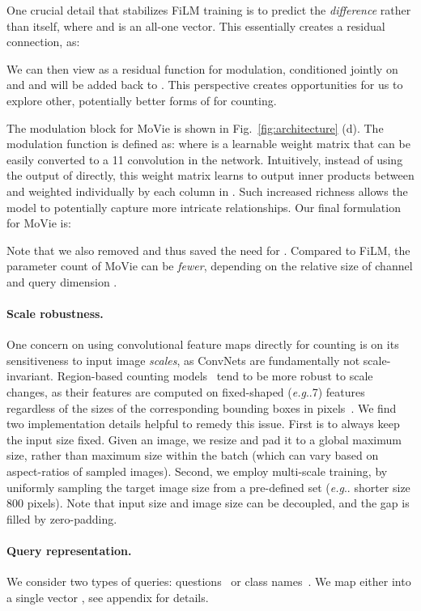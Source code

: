 \documentclass{article} \usepackage[dvipsnames,table]{xcolor}
\makeatletter
\newcommand{\ours}[0]{MoVie\xspace}
\def\x{\xspace}
\DeclareRobustCommand\onedot{\futurelet\@let@token\@onedot}
\def\@onedot{\ifx\@let@token.\else.\null\fi\xspace}
\def\eg{\emph{e.g}\onedot} \def\Eg{\emph{E.g}\onedot}
\makeatother
\begin{document}
One crucial detail that stabilizes FiLM training is to predict the \emph{difference}  rather than  itself, where  and  is an all-one vector. This essentially creates a residual connection, as:

We can then view  as a residual function for modulation, conditioned jointly on  and  and will be added back to . This perspective creates opportunities for us to explore other, potentially better forms of  for counting.

The modulation block for \ours is shown in Fig.~\ref{fig:architecture} (d). The modulation function is defined as:  where  is 
a learnable weight matrix that can be easily converted to a 1{\x}1 convolution in the network. Intuitively, instead of using the output of  directly, this weight matrix learns to output  inner products between  and  weighted individually by each column in . Such increased richness allows the model to potentially capture more intricate relationships. Our final formulation for \ours is: 

Note that we also removed  and thus saved the need for . Compared to FiLM, the parameter count of \ours can be \emph{fewer}, depending on the relative size of channel  and query dimension . 
\paragraph{Scale robustness.} One concern on using convolutional feature maps directly for counting is on its sensitiveness to input image \emph{scales}, as ConvNets are fundamentally not scale-invariant. Region-based counting models~\cite{trott2018interpretable,zhang2018learning} tend to be more robust to scale changes, as their features are computed on fixed-shaped (\eg 7{\x}7) features regardless of the sizes of the corresponding bounding boxes in pixels~\cite{ren2015faster}. We find two implementation details helpful to remedy this issue. First is to always keep the input size fixed. Given an image, we resize and pad it to a global maximum size, rather than maximum size within the batch (which can vary based on aspect-ratios of sampled images). Second, we employ multi-scale training, by uniformly sampling the target image size from a pre-defined set (\eg shorter size 800 pixels). Note that input size and image size can be decoupled, and the gap is filled by zero-padding.

\paragraph{Query representation.} We consider two types of queries: questions~\cite{trott2018interpretable} or class names~\cite{chattopadhyay2017counting}. We map either into a single vector , see appendix for details.
\end{document}
